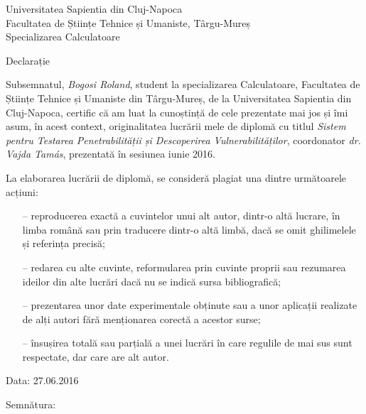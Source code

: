 
\newpage
\pagestyle{plain}

	\begin{center}
		{\Large Universitatea Sapientia din Cluj-Napoca}\\\vspace{0.07in}
		{\Large Facultatea de Științe Tehnice și Umaniste, Târgu-Mureș}\\\vspace{0.07in}
		{\Large Specializarea Calculatoare}\\
		
		\vspace{1.5cm}
		
		{\Large Declarație}
	\end{center}
	
	Subsemnatul, \emph{Bogosi Roland}, student la specializarea Calculatoare, Facultatea de Științe Tehnice și Umaniste din Târgu-Mureș, de la Universitatea Sapientia din Cluj-Napoca, certific că am luat la cunoștință de cele prezentate mai jos și îmi asum, în acest context, originalitatea lucrării mele de diplomă cu titlul \emph{Sistem pentru Testarea Penetrabilității și Descoperirea Vulnerabilităților}, coordonator \emph{dr. Vajda Tamás}, prezentată în sesiunea iunie 2016.
	
	\vspace{\fill}
	
	\noindent La elaborarea lucrării de diplomă, se consideră plagiat una dintre următoarele acțiuni:
	
	\begin{itemize}
		\item[--] reproducerea exactă a cuvintelor unui alt autor, dintr-o altă lucrare, în limba română sau prin traducere dintr-o altă limbă, dacă se omit ghilimelele și referința precisă;
		\item[--] redarea cu alte cuvinte, reformularea prin cuvinte proprii sau rezumarea ideilor din alte lucrări dacă nu se indică sursa bibliografică;
		\item[--] prezentarea unor date experimentale obținute sau a unor aplicații realizate de alți autori fără menționarea corectă a acestor surse;
		\item[--] însușirea totală sau parțială a unei lucrări în care regulile de mai sus sunt respectate, dar care are alt autor.
	\end{itemize}
	
	\begin{multicols}{2}
		\noindent Data: 27.06.2016
		\columnbreak
		\begin{center}
			Semnătura:
		\end{center}
	\end{multicols}
	
